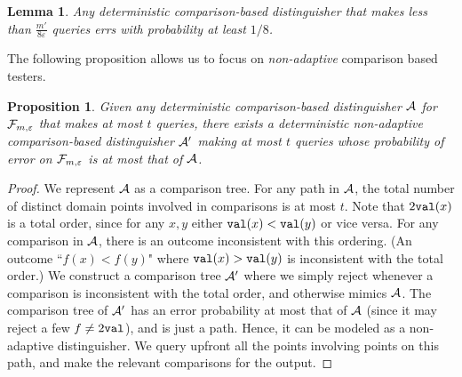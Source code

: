 \documentclass[11pt]{article}
\newtheorem{lemma}[theorem]{Lemma}
\newtheorem{proposition}[theorem]{Proposition}
\def\eps{\varepsilon}
\newcommand{\cA}{{\cal A}}
\newcommand{\cF}{{\cal F}}
\begin{document}
\begin{lemma} \label{lem:main-hard} Any deterministic comparison-based distinguisher that makes less than $\frac{m'}{8\eps}$ queries errs
with probability at least $1/8$.
\end{lemma}

\noindent
The following proposition allows us to focus on {\em non-adaptive} comparison based testers. 


\begin{proposition}	\label{prop:comp}
Given any deterministic comparison-based distinguisher $\cA$ for $\cF_{m,\eps}$ that makes at most $t$ queries, there exists a deterministic {\em non-adaptive} comparison-based distinguisher $\cA'$ making at most $t$ queries whose probability of error on $\cF_{m,\eps}$ is at most that of $\cA$.
\end{proposition}
\def\ans{{\tt ans}}
\begin{proof}
We represent $\cA$ as a comparison tree. For any path in $\cA$, the total number of distinct domain points involved in comparisons is at most $t$.
Note that $2\v(x)$ is a total order, since for any $x,y$ either $\v(x) < \v(y)$ or vice versa.
For any comparison in $\cA$, there is an outcome inconsistent with this ordering. (An outcome ``$f(x) < f(y)$"
where $\v(x) > \v(y)$ is inconsistent with the total order.)
We construct a comparison tree $\cA'$
where we simply reject whenever a comparison is inconsistent with the total order, and otherwise mimics $\cA$. 
The comparison tree of $\cA'$ has an error probability at most that of $\cA$ (since it may reject a few $f\neq 2\v$), and is just a path. Hence, it
can be modeled as a non-adaptive distinguisher. We query upfront all the points involving points on this path, and make the relevant comparisons
for the output.
\end{proof}





\def\v{{\tt val}}
\end{document}
